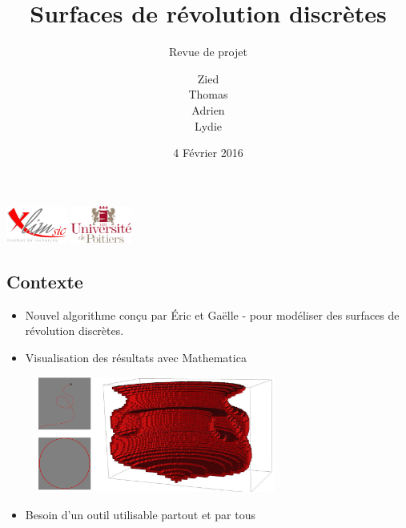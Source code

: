 \documentclass{beamer}
\title[Revue de projet]{Surfaces de r\'evolution discrètes}
\subtitle{Revue de projet}
\author[]{Zied \smallcaps{Ben} \smallcaps{Othmane} \\ Thomas \smallcaps{Benoist}
	\\ Adrien \smallcaps{Bisutti} \\ Lydie \smallcaps{Richaume}}
\institute{Universit\'e de Poitiers}
\date{4 Février 2016}
\begin{document}


\begin{frame}
	\titlepage
	\includegraphics[width=2cm]{../Images/logo-Xlim.png}
	\hfill
	\includegraphics[width=2cm]{../Images/logo_univ_poitiers.png}
\end{frame}




	\subsection{Contexte}
	\begin{frame}{\subsecname}
		\begin{itemize}
			\item Nouvel algorithme conçu par \'Eric  et Gaëlle - pour mod\'eliser des surfaces de r\'evolution discrètes.
			\item Visualisation des r\'esultats avec Mathematica
		\end{itemize}
		\begin{figure}
			\includegraphics[height=3.8cm]{../Images/revolution2.jpg}
		\end{figure}
		\begin{itemize}
			\item Besoin d'un outil utilisable partout et par tous
		\end{itemize}
	\end{frame}
\end{document}
